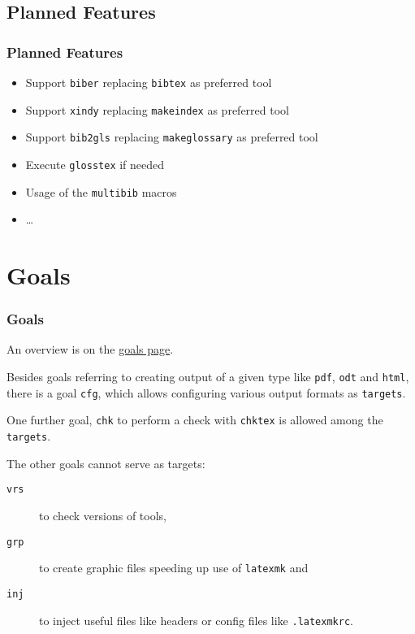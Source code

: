 \subsection{Planned Features}

\begin{frame}
  \frametitle{Planned Features}
  \begin{itemize}
  \item Support \texttt{biber} replacing \texttt{bibtex} as preferred tool
  \item Support \texttt{xindy} replacing \texttt{makeindex} as preferred tool
  \item Support \texttt{bib2gls} replacing \texttt{makeglossary} as preferred tool
  \item Execute \texttt{glosstex} if needed
  \item Usage of the \texttt{multibib} macros
  \item \dots
  \end{itemize}
\end{frame}


\section{Goals}

\begin{frame}
  \frametitle{Goals}

  An overview is on the 
  \href{http://simuline.eu/LatexMavenPlugin/plugin-info.html}{goals page}. 
  
  Besides goals referring to creating output of a given type 
  like \alert{\texttt{pdf}}, \alert{\texttt{odt}} and \alert{\texttt{html}}, 
  there is a goal \alert{\texttt{cfg}}, 
  which allows 
  \alert con\alert fi\alert guring various output formats as \texttt{targets}. %
  
  One further goal, \alert{\texttt{chk}} to perform a check with \texttt{chktex} 
  is allowed among the \texttt{targets}. 

  The other goals cannot serve as targets: 
  \begin{description}
    \item[\texttt{vrs}] to check versions of tools, 
    \item[\texttt{grp}] to create graphic files speeding up use of \texttt{latexmk} 
    and 
    \item[\texttt{inj}] to inject useful files like headers or config files 
    like \texttt{.latexmkrc}. 
  \end{description}
  

\end{frame}

